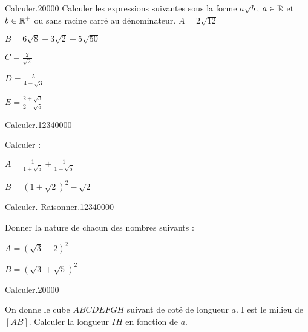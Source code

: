 
\begin{pageParcoursd} %





 



 \begin{ExoCdN}{Calculer.}{2}{0}{0}{0}{0}
Calculer les expressions suivantes sous la forme $a\sqrt{b}$, $a\in \mathbb R$ et $b \in \mathbb R^+$ ou sans racine carré au dénominateur.
$A=2\sqrt{12}$

$B= 6\sqrt{8} + 3\sqrt{2} + 5\sqrt{50}$

$C=\frac{2}{\sqrt{2}}$ 

$D= \frac{5}{4 - \sqrt{3}}$  

$E= \frac{2+\sqrt{3}}{2 - \sqrt{5}} $

\end{ExoCdN}




\begin{ExoCdN}{Calculer.}{1234}{0}{0}{0}{0}

Calculer : \vspace{0.4cm}

$A=\frac{1}{1+\sqrt5} +\frac{1}{1-\sqrt5} = $ 

$B=\left(1+\sqrt2\right)^2  -\sqrt2 = $ 
\end{ExoCdN}

 
\begin{ExoCdN}{Calculer. Raisonner.}{1234}{0}{0}{0}{0}

Donner la nature de chacun des nombres suivants : \vspace{0.4cm}

$A=\left( \sqrt3 + 2 \right)^2 $


$B=\left( \sqrt3 + \sqrt5 \right)^2 $
\end{ExoCdN}



 


\begin{ExoCdN}{Calculer.}{2}{0}{0}{0}{0}

 
On donne le cube $ABCDEFGH$ suivant de coté de longueur $a$. I est le milieu de $[AB]$. Calculer la longueur $IH$ en fonction de $a$.


\end{ExoCdN}
\end{pageParcoursd}
